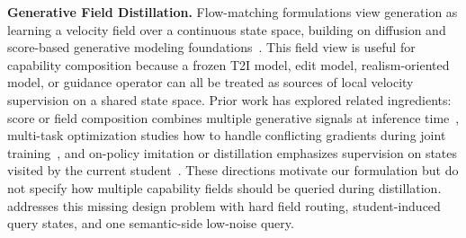 \noindent\textbf{Generative Field Distillation.}
Flow-matching formulations view generation as learning a velocity field over a continuous state space, building on diffusion and score-based generative modeling foundations~\cite{ho2020denoising,lipman2022flow,liu2022flow,albergo2025stochastic,tong2023improving,dao2023flow}. This field view is useful for capability composition because a frozen T2I model, edit model, realism-oriented model, or guidance operator can all be treated as sources of local velocity supervision on a shared state space. Prior work has explored related ingredients: score or field composition combines multiple generative signals at inference time~\cite{du2023reduce,bar2023multidiffusion}, multi-task optimization studies how to handle conflicting gradients during joint training~\cite{chen2018gradnorm,sener2018multi,yu2020gradient,liu2021conflict,javaloy2021rotograd}, and on-policy imitation or distillation emphasizes supervision on states visited by the current student~\cite{ross2011reduction,li2026diffusionopd,fang2026flow}. These directions motivate our formulation but do not specify how multiple capability fields should be queried during distillation. \name{} addresses this missing design problem with hard field routing, student-induced query states, and one semantic-side low-noise query.
